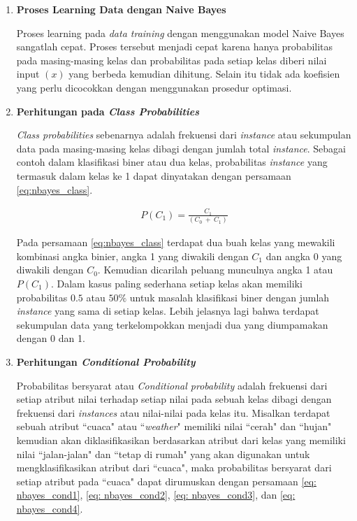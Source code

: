\begin{subs}
\begin{enumerate}[label=\textbf{\arabic*).}]
		\item \textbf{Proses Learning Data dengan Naive Bayes}
	
		Proses learning pada \textit{data training} dengan menggunakan model Naive Bayes sangatlah cepat. Proses tersebut menjadi cepat karena hanya probabilitas pada masing-masing kelas dan probabilitas pada setiap kelas diberi nilai input $(x)$ yang berbeda kemudian dihitung. Selain itu tidak ada koefisien yang perlu dicocokkan dengan menggunakan prosedur optimasi.
	
		\item \textbf{Perhitungan pada \textit{Class Probabilities}}
	
		\textit{Class probabilities} sebenarnya adalah frekuensi dari \textit{instance} atau sekumpulan data pada masing-masing kelas dibagi dengan jumlah total \textit{instance}. Sebagai contoh dalam klasifikasi biner atau dua kelas, probabilitas \textit{instance} yang termasuk dalam kelas ke 1 dapat dinyatakan dengan persamaan \ref{eq:nbayes_class}.
		
		\begin{equation}\label{eq:nbayes_class}
		\begin{split}
		P(C_{1}) = \frac{C_{1}}{(C_{0}\ +\ C_{1})}
		\end{split}
		\end{equation}
		
		Pada persamaan \ref{eq:nbayes_class} terdapat dua buah kelas yang mewakili kombinasi angka binier, angka 1 yang diwakili dengan $C_{1}$ dan angka 0 yang diwakili dengan $C_{0}$. Kemudian dicarilah peluang munculnya angka 1 atau $P(C_{1})$. Dalam kasus paling sederhana setiap kelas akan memiliki probabilitas $0.5$ atau $50\%$ untuk masalah klasifikasi biner dengan jumlah \textit{instance} yang sama di setiap kelas. Lebih jelasnya lagi bahwa terdapat sekumpulan data yang terkelompokkan menjadi dua yang diumpamakan dengan 0 dan 1.
		\vspace{1ex}
	
		\item \textbf{Perhitungan \textit{Conditional Probability}}
	
		Probabilitas bersyarat atau \textit{Conditional probability} adalah frekuensi dari setiap atribut nilai terhadap setiap nilai pada sebuah kelas dibagi dengan frekuensi dari \textit{instances} atau nilai-nilai pada kelas itu. Misalkan terdapat sebuah atribut ``cuaca" atau ``\textit{weather}" memiliki nilai ``cerah" dan ``hujan" kemudian akan diklasifikasikan berdasarkan atribut dari kelas yang memiliki nilai ``jalan-jalan" dan ``tetap di rumah" yang akan digunakan untuk mengklasifikasikan atribut dari ``cuaca", maka probabilitas bersyarat dari setiap atribut pada ``cuaca" dapat dirumuskan dengan persamaan \ref{eq: nbayes_cond1}, \ref{eq: nbayes_cond2}, \ref{eq: nbayes_cond3}, dan \ref{eq: nbayes_cond4}.
	

\end{enumerate}
\end{subs}
